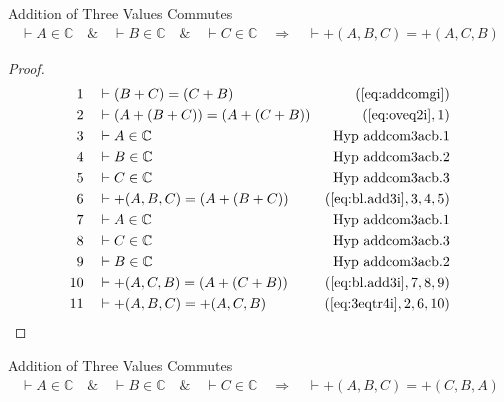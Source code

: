 \begin{lemma} {Addition of Three Values Commutes}
\begin{align}
\vdash A \in \mathbb{C}\quad\&\quad \vdash B \in \mathbb{C}\quad\&\quad \vdash
    C \in \mathbb{C}\quad\Rightarrow\quad \vdash +( A , B , C ) = +( A , C , B
    )\label{eq:bl.addcom3acb}\tag{bl.addcom3acb}
\end{align}
\end{lemma}


\begin{proof}
\begin{align}
  1 &&  & \vdash ( B + C ) = ( C + B )&(\mbox{\ref{eq:addcomgi}})\notag
  \\ 2 &&  & \vdash ( A + ( B + C ) ) = ( A + ( C + B )
     )&(\mbox{\ref{eq:oveq2i}},1)\notag
  \\ 3 &&  & \vdash A \in
\mathbb{C}&\text{Hyp~addcom3acb.1}\notag%
  \\ 4 &&  & \vdash B \in
\mathbb{C}&\text{Hyp~addcom3acb.2}\notag%
  \\ 5 &&  & \vdash C \in
\mathbb{C}&\text{Hyp~addcom3acb.3}\notag%
  \\ 6 &&  & \vdash +( A , B , C ) = ( A + ( B + C )
     )&(\mbox{\ref{eq:bl.add3i}},3,4,5)\notag
  \\ 7 &&  & \vdash A \in
\mathbb{C}&\text{Hyp~addcom3acb.1}\notag%
  \\ 8 &&  & \vdash C \in
\mathbb{C}&\text{Hyp~addcom3acb.3}\notag%
  \\ 9 &&  & \vdash B \in
\mathbb{C}&\text{Hyp~addcom3acb.2}\notag%
  \\ 10 &&  & \vdash +( A , C , B ) = ( A + ( C + B )
     )&(\mbox{\ref{eq:bl.add3i}},7,8,9)\notag
  \\ 11 &&  & \vdash +( A , B , C ) = +( A , C , B
     )&(\mbox{\ref{eq:3eqtr4i}},2,6,10)\notag
\end{align}
\end{proof}

\begin{lemma} {Addition of Three Values Commutes}
\begin{align}
\vdash A \in \mathbb{C}\quad\&\quad \vdash B \in \mathbb{C}\quad\&\quad \vdash
    C \in \mathbb{C}\quad\Rightarrow\quad \vdash +( A , B , C ) = +( C , B , A
    )\label{eq:bl.addcom3ac}\tag{bl.addcom3ac}
\end{align}
\end{lemma}


